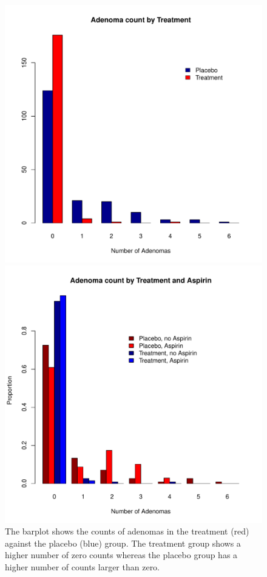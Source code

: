 \documentclass[paper=a4, fontsize=11pt]{scrartcl} %
\numberwithin{equation}{section} %
\numberwithin{figure}{section} %
\numberwithin{table}{section} %
\begin{document}
\begin{figure}[H]
  \centering
  \begin{minipage}[b]{0.38\textwidth}
    \includegraphics[width=\textwidth]{./rcode/plots/bivariate_barplot_adenomas}
    \caption{The barplot shows the counts of adenomas in the treatment (red) against the placebo (blue) group. The treatment group shows a higher number of zero counts whereas the placebo group has a higher number of counts larger than zero.}
    \label{fig:counts_stratified}
  \end{minipage}
  \hfill
  \begin{minipage}[b]{0.38\textwidth}
    \includegraphics[width=\textwidth]{./rcode/plots/trivariate_barplot_adenomas}

\end{minipage}
\end{figure}
\end{document}
